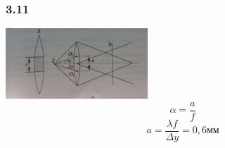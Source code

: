 \subsubsection*{3.11}
\includegraphics[width=0.4\textwidth]{parts/img/3_16.jpg}
\begin{equation*}
	\alpha = \frac{a}{f}
\end{equation*}
\begin{equation*}
	a = \frac{\lambda f}{\Delta y} = 0,6мм
\end{equation*}
